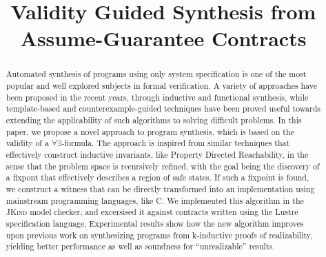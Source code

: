 \documentclass[10pt,conference]{IEEEtran}
\newcommand{\jkind}{\textsc{JKind}\xspace}
\newcounter{template}
\begin{document}
\title{Validity Guided Synthesis from Assume-Guarantee Contracts}
\maketitle

\begin{abstract}
Automated synthesis of programs using only system specification is one of
the most popular and well explored subjects in formal verification. A variety of
approaches have been proposed in the recent years, through inductive and
functional synthesis, while template-based and counterexample-guided techniques
have been proved useful towards extending the applicability of such algorithms
to solving difficult problems. In this paper, we propose a novel approach to
program synthesis, which is based on the validity of a $\forall\exists$-formula.
The approach is inspired from similar techniques that effectively construct
inductive invariants, like Property Directed Reachability, in the sense that the
problem space is recursively refined, with the goal being the discovery of a
fixpont that effectively describes a region of safe states. If such a fixpoint
is found, we construct a witness that can be directly transformed into an
implementation using mainstream programming languages, like C. We implemented
this algorithm in the \jkind model checker, and excersised it against contracts
written using the Lustre specification language. Experimental results show how
the new algorithm improves upon previous work on synthesizing programs from k-inductive proofs of
realizability, yielding better performance as well as soundness for ``unrealizable'' results.
\end{abstract}











\end{document}

